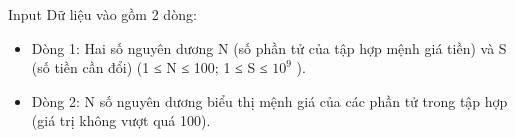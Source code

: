 Input
Dữ liệu vào gồm 2 dòng:  
\begin{itemize}
	\item     Dòng 1: Hai số nguyên dương N (số phần tử của tập hợp mệnh giá tiền) và S (số tiền cần đổi) (1 ≤ N ≤ 100; 1 ≤ S ≤ $10^{9}$    ).   
	\item     Dòng 2: N số nguyên dương biểu thị mệnh giá của các phần tử trong tập hợp (giá trị không vượt quá 100).   
\end{itemize}
